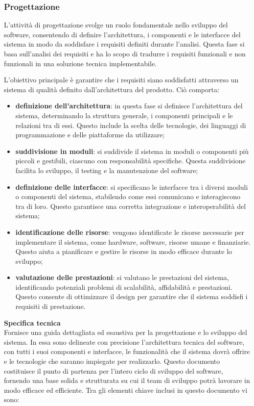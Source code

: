 \subsubsection{Progettazione}
L'attività di progettazione svolge un ruolo fondamentale nello sviluppo del software, consentendo di definire l'architettura, i componenti e le interfacce del sistema in modo da soddisfare i requisiti definiti durante l'analisi.  Questa fase si basa sull'analisi dei requisiti e ha lo scopo di tradurre i requisiti funzionali e non funzionali in una soluzione tecnica implementabile. 

L'obiettivo principale è garantire che i requisiti siano soddisfatti attraverso un sistema di qualità definito dall'architettura del prodotto. Ciò comporta:
\begin{itemize}
	\item \textbf{definizione dell'architettura}: in questa fase si definisce l'architettura del sistema, determinando la struttura generale, i componenti principali e le relazioni tra di essi. Questo include la scelta delle tecnologie, dei linguaggi di programmazione e delle piattaforme da utilizzare;
	\item \textbf{suddivisione in moduli}: si suddivide il sistema in moduli o componenti più piccoli e gestibili, ciascuno con responsabilità specifiche. Questa suddivisione facilita lo sviluppo, il testing e la manutenzione del software;
	\item \textbf{definizione delle interfacce}: si specificano le interfacce tra i diversi moduli o componenti del sistema, stabilendo come essi comunicano e interagiscono tra di loro. Questo garantisce una corretta integrazione e interoperabilità del sistema;
	\item \textbf{identificazione delle risorse}: vengono identificate le risorse necessarie per implementare il sistema, come hardware, software, risorse umane e finanziarie. Questo aiuta a pianificare e gestire le risorse in modo efficace durante lo sviluppo;
	\item \textbf{valutazione delle prestazioni}: si valutano le prestazioni del sistema, identificando potenziali problemi di scalabilità, affidabilità e prestazioni. Questo consente di ottimizzare il design per garantire che il sistema soddisfi i requisiti di prestazione.
\end{itemize}
\newpage
{}
\textbf{Specifica tecnica}\\ Fornisce una guida dettagliata ed esaustiva per la progettazione e lo sviluppo del sistema. In essa sono delineate con precisione l'architettura tecnica del software, con tutti i suoi componenti e interfacce, le funzionalità che il sistema dovrà offrire e le tecnologie che saranno impiegate per realizzarlo. Questo documento costituisce il punto di partenza per l'intero ciclo di sviluppo del software, fornendo una base solida e strutturata su cui il team di sviluppo potrà lavorare in modo efficace ed efficiente. Tra gli elementi chiave inclusi in questo documento vi sono:
